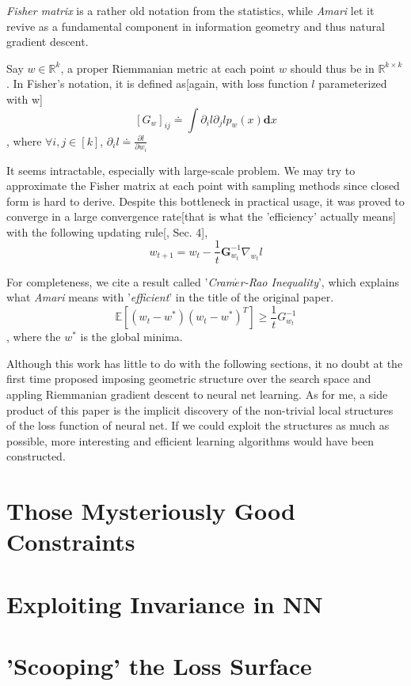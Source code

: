 \documentclass[10pt,a4paper]{article}
\begin{document}
\textit{Fisher matrix} is a rather old notation from the statistics, while \textit{Amari} let it revive as a fundamental component in information geometry and thus natural gradient descent.

Say $w\in\mathbb{R}^k$, a proper Riemmanian metric at each point $w$ should thus be in $\mathbb{R}^{k\times{k}}$. In Fisher's notation, it is defined as[again, with loss function $\mathit{l}$ parameterized with w] 
$$
	[G_{w}]_{ij} \doteq{\int}\partial_i\mathit{l}\partial_j\mathit{l}p_w(x)\mathbf{d}{x}
$$  
, where $\forall{i,j}\in[k]$, $\partial_{i}l\doteq\frac{\partial{l}}{\partial{w_i}}$

It seems intractable, especially with large-scale problem. We may try to approximate the Fisher matrix at each point with sampling methods since closed form is hard to derive. Despite this bottleneck in practical usage, it was proved to converge in a large convergence rate[that is what the 'efficiency' actually means] with the following updating rule[\cite{Amari1998}, Sec. 4],
$$
	w_{t+1} = w_{t}-\frac{1}{t}\mathbf{G}_{w_t}^{-1}\nabla_{w_t}\mathit{l}
$$

For completeness, we cite a result called '\textit{Cram$\acute{e}$r-Rao Inequality}', which explains what \textit{Amari} means with '\textit{efficient}' in the title of the original paper. 
$$
	\mathbb{E}[(w_t-w^{*})(w_t-w^{*})^{T}]\geq\frac{1}{t}G_{w_t}^{-1}
$$
, where the $w^{*}$ is the global minima.

Although this work has little to do with the following sections, it no doubt at the first time proposed imposing geometric structure over the search space and appling Riemmanian gradient descent to neural net learning. As for me, a side product of this paper is the implicit discovery of the non-trivial local structures of the loss function of neural net. If we could exploit the structures as much as possible, more interesting and efficient learning algorithms would have been constructed.

\section{Those Mysteriously Good Constraints\cite{Arjovsky2016}}
\section{Exploiting Invariance in NN}
\section{'Scooping' the Loss Surface}
\end{document}

